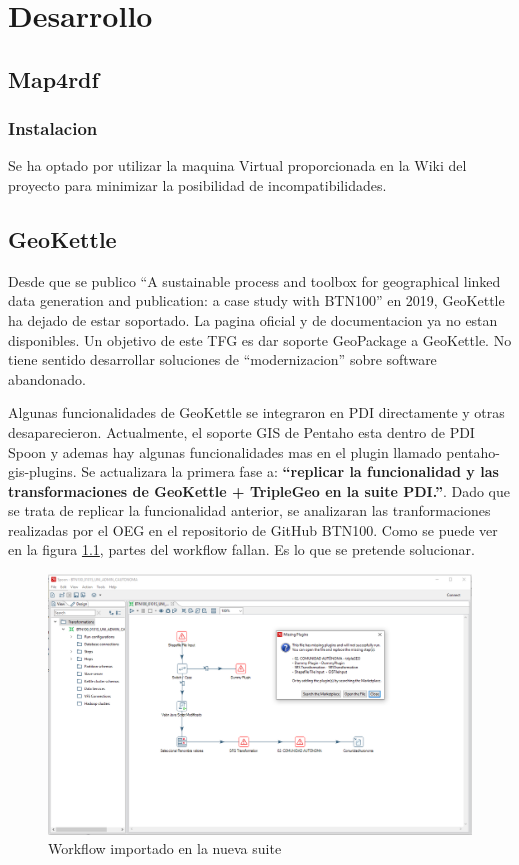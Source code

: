 \chapter{Desarrollo}

\section{Map4rdf}
\subsection{Instalacion}

Se ha optado por utilizar la maquina Virtual proporcionada en la Wiki del proyecto para minimizar la posibilidad
de incompatibilidades.

\section{GeoKettle}

Desde que se publico ``A sustainable process and toolbox for geographical linked data generation and
publication: a case study with BTN100'' en 2019, GeoKettle ha dejado de estar soportado. La pagina oficial y de
documentacion ya no estan disponibles.
Un objetivo de este TFG es dar soporte GeoPackage a GeoKettle. No tiene sentido desarrollar soluciones de
``modernizacion'' sobre software abandonado.

Algunas funcionalidades de GeoKettle se integraron en PDI directamente y otras desaparecieron. 
Actualmente, el soporte GIS de Pentaho esta dentro de PDI Spoon y ademas hay algunas funcionalidades mas en
 el plugin llamado pentaho-gis-plugins\cite{gis-plugins}. Se actualizara la primera fase a:
\textbf{``replicar la funcionalidad y las transformaciones de GeoKettle + TripleGeo en la suite PDI.''}. 
Dado que se trata de replicar la funcionalidad anterior, se analizaran las tranformaciones realizadas por el OEG
en el repositorio de GitHub BTN100. Como se puede ver en la figura \ref{fig:spoon-missing-plugins}, partes del
workflow fallan. Es lo que se pretende solucionar.

\begin{figure}[H]
    \includegraphics[width=\textwidth]{images/spoon-missing-plugins.png}
    \centering
    \caption{Workflow importado en la nueva suite}
    \label{fig:spoon-missing-plugins}
\end{figure}

